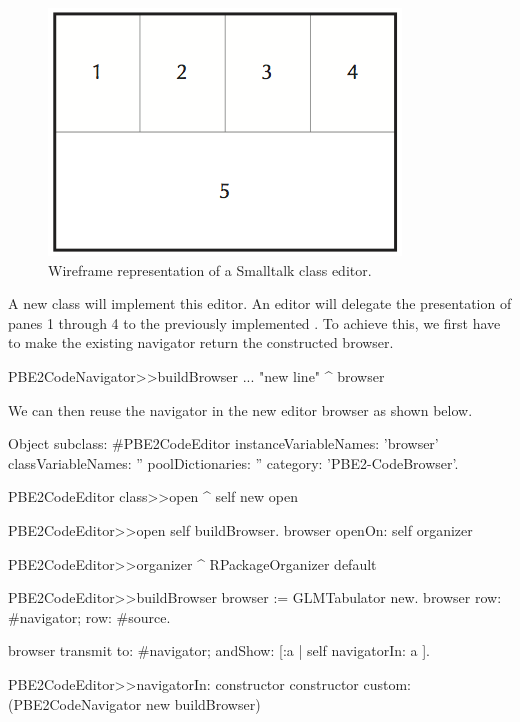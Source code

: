 \documentclass[a4paper,10pt,twoside]{book}
\begin{document}
\begin{figure}[htbp]
\centerline{\includegraphics[width=\linewidth]{classbrowser_wireframe.png}}
\caption{Wireframe representation of a Smalltalk class editor.}
\label{fig:classbrowser_wireframe}
\end{figure}

A new class  will implement this editor. An editor will delegate the presentation
of panes 1 through 4 to the previously implemented
. To achieve this, we first have to make the
existing navigator return the constructed browser. 

\begin{code}{}
PBE2CodeNavigator>>buildBrowser
  ...
  "new line"
  ^ browser 
\end{code}

We can then reuse the navigator in the new editor browser as shown
below.

\begin{code}{}
Object subclass: #PBE2CodeEditor
	instanceVariableNames: 'browser'
	classVariableNames: ''
	poolDictionaries: ''
	category: 'PBE2-CodeBrowser'.

PBE2CodeEditor class>>open
  ^ self new open

PBE2CodeEditor>>open
  self buildBrowser.
  browser openOn:  self  organizer

PBE2CodeEditor>>organizer 
  ^ RPackageOrganizer default

PBE2CodeEditor>>buildBrowser 
  browser := GLMTabulator new.
  browser 
    row: #navigator;
    row: #source.
    
  browser transmit to: #navigator; andShow:  [:a | self navigatorIn: a ]. 

PBE2CodeEditor>>navigatorIn:  constructor
  constructor custom: (PBE2CodeNavigator new buildBrowser)
\end{code}
\end{document}
